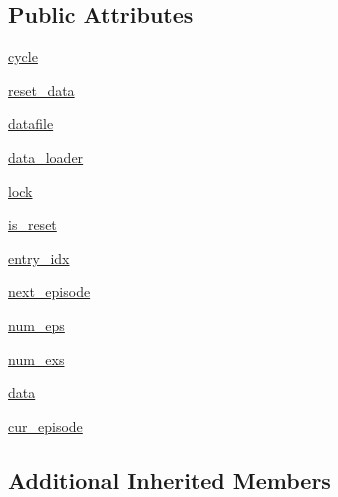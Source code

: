 \subsection*{Public Attributes}
\begin{DoxyCompactItemize}
\item 
\hyperlink{classparlai_1_1core_1_1teachers_1_1StreamDialogData_af41dd0f335bb24f499376f0b55ebea93}{cycle}
\item 
\hyperlink{classparlai_1_1core_1_1teachers_1_1StreamDialogData_ae054596c459b22bbeacf622a5208b785}{reset\+\_\+data}
\item 
\hyperlink{classparlai_1_1core_1_1teachers_1_1StreamDialogData_a4c7f45ba690d0533d6a8c5c0235155b2}{datafile}
\item 
\hyperlink{classparlai_1_1core_1_1teachers_1_1StreamDialogData_a35ddb652bb3255dba53d5fd69046ebb7}{data\+\_\+loader}
\item 
\hyperlink{classparlai_1_1core_1_1teachers_1_1StreamDialogData_adcc1f5f967652688ec8dbcfb3abbcaa6}{lock}
\item 
\hyperlink{classparlai_1_1core_1_1teachers_1_1StreamDialogData_a30ca966ffb33e7cbc8f97e9b8837cbc1}{is\+\_\+reset}
\item 
\hyperlink{classparlai_1_1core_1_1teachers_1_1StreamDialogData_af239ccfb38c42707c97eb8575fb82f10}{entry\+\_\+idx}
\item 
\hyperlink{classparlai_1_1core_1_1teachers_1_1StreamDialogData_a40ac215e58913119b1406b1d440a55f4}{next\+\_\+episode}
\item 
\hyperlink{classparlai_1_1core_1_1teachers_1_1StreamDialogData_a8f5807d28b1b0a4d7eb09ae287b2c01b}{num\+\_\+eps}
\item 
\hyperlink{classparlai_1_1core_1_1teachers_1_1StreamDialogData_a6aa5dc9644a792b801bc7cf69a194ae6}{num\+\_\+exs}
\item 
\hyperlink{classparlai_1_1core_1_1teachers_1_1StreamDialogData_ab015e93ae59c4b98f3f9dd883f6f07b2}{data}
\item 
\hyperlink{classparlai_1_1core_1_1teachers_1_1StreamDialogData_ae045cda37bbe4fd67fdca7f902de8862}{cur\+\_\+episode}
\end{DoxyCompactItemize}
\subsection*{Additional Inherited Members}


